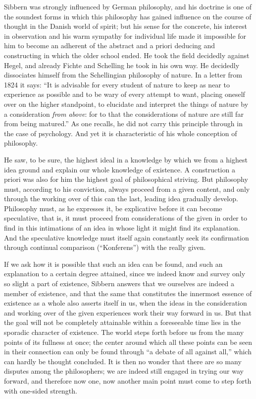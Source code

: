 \documentclass[12pt,a4paper,openany]{book}
\newcommand{\opage}[1]{\marginnote{\footnotesize\textit{[#1]}}}
\begin{document}
Sibbern was strongly influenced by German philosophy, and
his doctrine is one of the soundest forms in which this
philosophy has gained influence on the course of thought in the Danish
world of spirit; but his sense for the concrete, his
interest in observation and his warm sympathy for individual
life made it impossible for him to become an adherent of the
abstract and a priori deducing and constructing in which the
older school ended. He took the field decidedly against Hegel,
and already Fichte and Schelling he took in his own way.
He decidedly dissociates himself from the Schellingian philosophy of nature.
In a letter from 1824 it says: ``It is advisable for every
student of nature to keep as near to experience as possible
and to be wary of every attempt to want, placing
oneself over on the higher standpoint, to elucidate and interpret
the things of nature by a consideration \emph{from above}: for to that
the considerations of nature are still far from being matured.'' As one recalls,
he did not carry this principle through in the case of psychology.
And yet it is characteristic of his whole
conception of philosophy.

He saw, to be sure, the highest ideal in a knowledge
by which we from a highest idea ground and explain
our whole knowledge of existence. A construction a priori
\opage{85}was also for him the highest goal of philosophical striving.
But philosophy must, according to his conviction, always proceed
from a given content, and only through the working over of this
can the last, leading idea gradually develop.
Philosophy must, as he expresses it, be explicative before it
can become speculative, that is, it must proceed from
considerations of the given in order to find in this intimations
of an idea in whose light it might find its explanation.
And the speculative knowledge must itself again constantly seek
its confirmation through continual comparison (``Konferens'')
with the really given.

If we ask how it is possible that such an idea
can be found, and such an explanation to a certain degree attained,
since we indeed know and survey only so slight a part of
existence, Sibbern answers that we ourselves are indeed a member of
existence, and that the same that constitutes the innermost
essence of existence as a whole also asserts itself in us, when the ideas
in the consideration and working over of the given experiences
work their way forward in us. But that the goal will not
be completely attainable within a foreseeable time lies in the sporadic character of
existence. The world steps forth before us from the many
points of its fullness at once; the center around which all
these points can be seen in their connection can only
be found through ``a debate of all against all,'' which can hardly
be thought concluded. It is then no wonder that there are so many
disputes among the philosophers; we are indeed still engaged in
trying our way forward, and therefore now one, now another
main point must come to step forth with one-sided strength.
\end{document}
